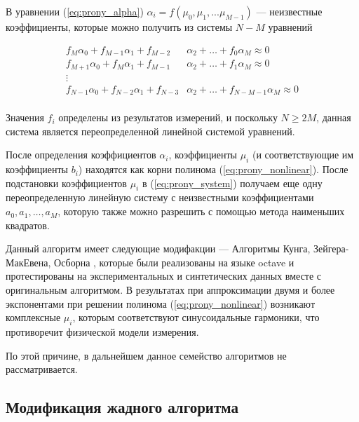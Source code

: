 В уравнении (\ref{eq:prony_alpha})  $\alpha_i = f (\mu_0, \mu_1, ... \mu_{M-1} )$  --- неизвестные коэффициенты, которые можно получить из системы $ N - M $ уравнений 

\begin{equation}
  \begin{split}
  f_M \alpha_0 + f_{M-1} \alpha_1 + f_{M-2} & \alpha_2 + \ldots + f_0 \alpha_M \approx 0  \\
  f_{M+1} \alpha_0 + f_{M} \alpha_1 + f_{M-1} & \alpha_2 + \ldots + f_1 \alpha_M \approx 0 \\
  \vdots & \\
  f_{N-1} \alpha_0 + f_{N-2} \alpha_1 + f_{N-3} & \alpha_2 + \ldots + f_{N-M-1} \alpha_M \approx 0  \\
  \end{split}
  \label{eq:prony_system2}
\end{equation}

Значения $f_i$ определены из результатов измерений, и поскольку $N \geq 2M$, данная система является переопределенной линейной системой уравнений.

После определения коэффициентов $\alpha_i$, коэффициенты $\mu_i$ (и соответствующие им коэффициенты $b_i$) находятся как корни полинома (\ref{eq:prony_nonlinear}). После подстановки коэффициентов $\mu_i$ в (\ref{eq:prony_system}) получаем еще одну переопределенную линейную систему с неизвестными коэффициентами $a_0, a_1, \ldots, a_M$, которую также можно разрешить с помощью метода наименьших квадратов.  


Данный алгоритм имеет следующие модифакции --- Алгоритмы Кунга, Зейгера-МакЕвена, Осборна \cite{kung, zeiger, osborn}, которые были реализованы на языке octave и протестированы на экспериментальных и синтетических данных вместе с оригинальным алгоритмом. В результатах при аппроксимации двумя и более экспонентами при решении полинома (\ref{eq:prony_nonlinear}) возникают комплексные $\mu_i$, которым соответствуют синусоидальные гармоники, что противоречит физической модели измерения. 

По этой причине, в дальнейшем данное семейство алгоритмов не рассматривается.




\subsection{Модификация жадного алгоритма}\label{subsect2_3_4}

